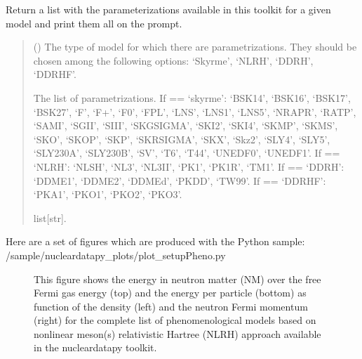 \documentclass[letterpaper,10pt,english]{sphinxmanual}
\begin{document}

\begin{fulllineitems}
\label{\detokenize{source/api/setup_pheno:nucleardatapy.setup_pheno.params_pheno}}
\pysigstartsignatures
{}
\pysigstopsignatures
\sphinxAtStartPar
Return a list with the parameterizations available in
this toolkit for a given model and print them all on the prompt.
\begin{quote}\begin{description}
\sphinxAtStartPar
{} () \textendash{} The type of model for which there are parametrizations.     They should be chosen among the following options: ‘Skyrme’, ‘NLRH’,     ‘DDRH’, ‘DDRHF’.

\sphinxAtStartPar
The list of parametrizations.     If  == ‘skyrme’: ‘BSK14’,     ‘BSK16’, ‘BSK17’, ‘BSK27’, ‘F\sphinxhyphen{}’, ‘F+’, ‘F0’, ‘FPL’, ‘LNS’, ‘LNS1’, ‘LNS5’,     ‘NRAPR’, ‘RATP’, ‘SAMI’, ‘SGII’, ‘SIII’, ‘SKGSIGMA’, ‘SKI2’, ‘SKI4’, ‘SKMP’,     ‘SKMS’, ‘SKO’, ‘SKOP’, ‘SKP’, ‘SKRSIGMA’, ‘SKX’, ‘Skz2’, ‘SLY4’, ‘SLY5’,     ‘SLY230A’, ‘SLY230B’, ‘SV’, ‘T6’, ‘T44’, ‘UNEDF0’, ‘UNEDF1’.     If  == ‘NLRH’: ‘NL\sphinxhyphen{}SH’, ‘NL3’, ‘NL3II’, ‘PK1’, ‘PK1R’, ‘TM1’.     If  == ‘DDRH’: ‘DDME1’, ‘DDME2’, ‘DDMEd’, ‘PKDD’, ‘TW99’.     If  == ‘DDRHF’: ‘PKA1’, ‘PKO1’, ‘PKO2’, ‘PKO3’.

\sphinxAtStartPar
list{[}str{]}.

\end{description}\end{quote}

\end{fulllineitems}


\sphinxAtStartPar
Here are a set of figures which are produced with the Python sample: /sample/nucleardatapy\_plots/plot\_setupPheno.py

\begin{figure}[htbp]
\centering
\capstart

\noindent{}
\caption{This figure shows the energy in neutron matter (NM) over the free Fermi gas energy (top) and the energy per particle (bottom) as function of the density (left) and the neutron Fermi momentum (right) for the complete list of phenomenological models based on non\sphinxhyphen{}linear meson(s) relativistic Hartree (NLRH) approach available in the nucleardatapy toolkit.}\label{\detokenize{source/api/setup_pheno:id1}}\end{figure}
\end{document}
